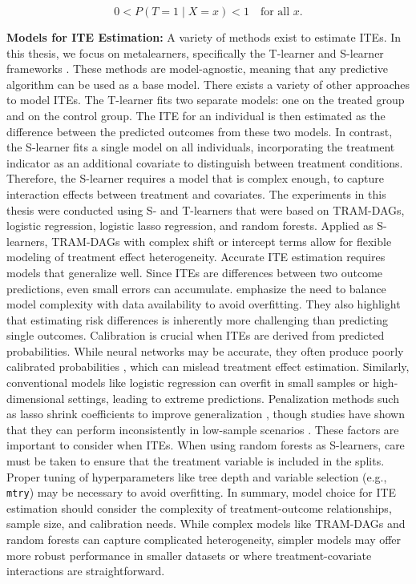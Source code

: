 \begin{equation}
0 < P(T = 1 \mid X = x) < 1 \quad \text{for all } x.
\end{equation}


\medskip




\textbf{Models for ITE Estimation:} \label{sec:ite_models} A variety of methods exist to estimate ITEs. In this thesis, we focus on metalearners, specifically the T-learner and S-learner frameworks \citep{kunzel2019}. These methods are model-agnostic, meaning that any predictive algorithm can be used as a base model. There exists a variety of other approaches to model ITEs. The T-learner fits two separate models: one on the treated group and on the control group. The ITE for an individual is then estimated as the difference between the predicted outcomes from these two models. In contrast, the S-learner fits a single model on all individuals, incorporating the treatment indicator as an additional covariate to distinguish between treatment conditions. Therefore, the S-learner requires a model that is complex enough, to capture interaction effects between treatment and covariates. The experiments in this thesis were conducted using S- and T-learners that were based on TRAM-DAGs, logistic regression, logistic lasso regression, and random forests. Applied as S-learners, TRAM-DAGs with complex shift or intercept terms allow for flexible modeling of treatment effect heterogeneity. 
Accurate ITE estimation requires models that generalize well. Since ITEs are differences between two outcome predictions, even small errors can accumulate. \citet{hoogland2021} emphasize the need to balance model complexity with data availability to avoid overfitting. They also highlight that estimating risk differences is inherently more challenging than predicting single outcomes. Calibration is crucial when ITEs are derived from predicted probabilities. While neural networks may be accurate, they often produce poorly calibrated probabilities \citep{guo2017}, which can mislead treatment effect estimation. Similarly, conventional models like logistic regression can overfit in small samples or high-dimensional settings, leading to extreme predictions. Penalization methods such as lasso shrink coefficients to improve generalization \citep{riley2021}, though studies have shown that they can perform inconsistently in low-sample scenarios \citep{calster2020}. These factors are important to consider when ITEs.
When using random forests as S-learners, care must be taken to ensure that the treatment variable is included in the splits. Proper tuning of hyperparameters like tree depth and variable selection (e.g., \texttt{mtry}) may be necessary to avoid overfitting.
In summary, model choice for ITE estimation should consider the complexity of treatment-outcome relationships, sample size, and calibration needs. While complex models like TRAM-DAGs and random forests can capture complicated heterogeneity, simpler models may offer more robust performance in smaller datasets or where treatment-covariate interactions are straightforward.



